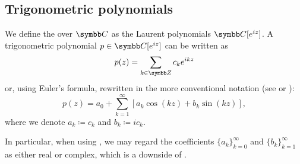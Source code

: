 \subsection{Trigonometric polynomials}\label{subsec:trigonometric_polynomials}

\begin{definition}\label{def:trigonometric_polynomial}
  We define the  over \( \BC \) as the Laurent polynomials \( \BC[e^{iz}] \). A trigonometric polynomial \( p \in \BC[e^{iz}] \) can be written as
  \begin{equation}\label{def:trigonometric_polynomial/exponential}
    p(z) = \sum_{k \in \BZ} c_k e^{ikz}
  \end{equation}
  or, using Euler's formula, rewritten in the more conventional notation (see \cite[1]{Боянов2008} or \cite[88]{Rudin1987}):
  \begin{equation}\label{def:trigonometric_polynomial/trigonometric}
    p(z) = a_0 + \sum_{k=1}^\infty [ a_k \cos(kz) + b_k \sin(kz) ],
  \end{equation}
  where we denote \( a_k \coloneqq c_k \) and \( b_k \coloneqq ic_k \).

  In particular, when using , we may regard the coefficients \( \{ a_k \}_{k=0}^\infty \) and \( \{ b_k \}_{k=1}^\infty \) as either real or complex, which is a downside of .
\end{definition}
